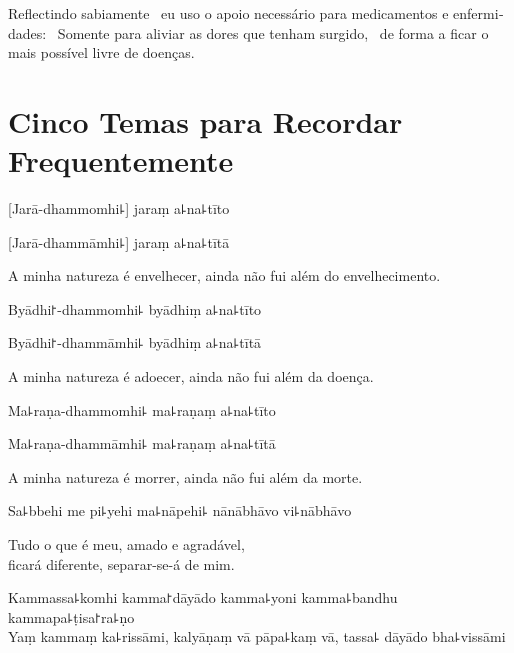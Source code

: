 \begin{english}
  Reflectindo sabiamente \pause\ eu uso o apoio necessário para medicamentos e
  enfermidades: \pause\ Somente para aliviar as dores que tenham surgido,
  \pause\ de forma a ficar o mais possível livre de doenças.
\end{english}

\clearpage

\chapter[Cinco Temas]{Cinco Temas para Recordar Frequentemente}


\begin{leader}
\end{leader}

%
[Jarā-dhammomhi꜕] jaraṃ a꜕na꜕tīto

%
[Jarā-dhammāmhi꜕] jaraṃ a꜕na꜕tītā

\begin{english}
  A minha natureza é envelhecer, ainda não fui além do envelhecimento.
\end{english}

%
Byādhi꜓-dhammomhi꜕ byādhiṃ a꜕na꜕tīto

%
Byādhi꜓-dhammāmhi꜕ byādhiṃ a꜕na꜕tītā

\begin{english}
  A minha natureza é adoecer, ainda não fui além da doença.
\end{english}

%
Ma꜕raṇa-dhammomhi꜕ ma꜕raṇaṃ a꜕na꜕tīto

%
Ma꜕raṇa-dhammāmhi꜕ ma꜕raṇaṃ a꜕na꜕tītā

\begin{english}
  A minha natureza é morrer, ainda não fui além da morte.
\end{english}

Sa꜕bbehi me pi꜕yehi ma꜕nāpehi꜕ nānābhāvo vi꜕nābhāvo

\begin{english}
  Tudo o que é meu, amado e agradável,\\
  ficará diferente, separar-se-á de mim.
\end{english}

%
Kammassa꜕komhi kamma꜓dāyādo kamma꜕yoni kamma꜕bandhu kammapa꜕ṭisa꜓ra꜕ṇo\\
Yaṃ kammaṃ ka꜕rissāmi, kalyāṇaṃ vā pāpa꜕kaṃ vā, tassa꜕ dāyādo bha꜕vissāmi


